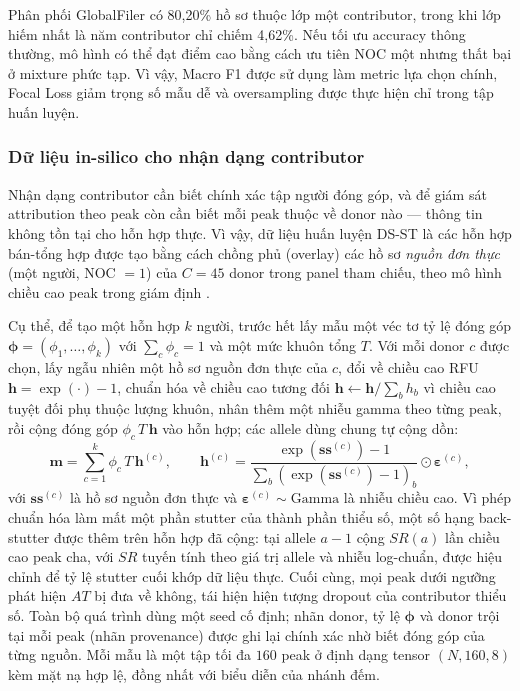 \documentclass[12pt,a4paper]{article}
\begin{document}
Phân phối GlobalFiler có 80,20\% hồ sơ thuộc lớp một contributor, trong khi lớp hiếm nhất là năm contributor chỉ chiếm 4,62\%. Nếu tối ưu accuracy thông thường, mô hình có thể đạt điểm cao bằng cách ưu tiên NOC một nhưng thất bại ở mixture phức tạp. Vì vậy, Macro F1 được sử dụng làm metric lựa chọn chính, Focal Loss giảm trọng số mẫu dễ và oversampling được thực hiện chỉ trong tập huấn luyện.

\subsubsection{Dữ liệu in-silico cho nhận dạng contributor}

Nhận dạng contributor cần biết chính xác tập người đóng góp, và để giám sát attribution theo peak còn cần biết mỗi peak thuộc về donor nào — thông tin không tồn tại cho hỗn hợp thực. Vì vậy, dữ liệu huấn luyện DS-ST là các hỗn hợp bán-tổng hợp được tạo bằng cách chồng phủ (overlay) các hồ sơ \emph{nguồn đơn thực} (một người, NOC \(=1\)) của \(C=45\) donor trong panel tham chiếu, theo mô hình chiều cao peak trong giám định \cite{bleka2016}.

Cụ thể, để tạo một hỗn hợp \(k\) người, trước hết lấy mẫu một véc tơ tỷ lệ đóng góp \(\bm{\phi}=(\phi_1,\dots,\phi_k)\) với \(\sum_c\phi_c=1\) và một mức khuôn tổng \(T\). Với mỗi donor \(c\) được chọn, lấy ngẫu nhiên một hồ sơ nguồn đơn thực của \(c\), đổi về chiều cao RFU \(\bm{h}=\exp(\cdot)-1\), chuẩn hóa về chiều cao tương đối \(\bm{h}\leftarrow\bm{h}/\textstyle\sum_b h_b\) vì chiều cao tuyệt đối phụ thuộc lượng khuôn, nhân thêm một nhiễu gamma theo từng peak, rồi cộng đóng góp \(\phi_c\,T\,\bm{h}\) vào hỗn hợp; các allele dùng chung tự cộng dồn:
\begin{equation}
\bm{m}=\sum_{c=1}^{k}\phi_c\,T\,\bm{h}^{(c)},\qquad \bm{h}^{(c)}=\frac{\exp(\bm{ss}^{(c)})-1}{\sum_b(\exp(\bm{ss}^{(c)})-1)_b}\odot \bm{\varepsilon}^{(c)},
\end{equation}
với \(\bm{ss}^{(c)}\) là hồ sơ nguồn đơn thực và \(\bm{\varepsilon}^{(c)}\sim\mathrm{Gamma}\) là nhiễu chiều cao. Vì phép chuẩn hóa làm mất một phần stutter của thành phần thiểu số, một số hạng back-stutter được thêm trên hỗn hợp đã cộng: tại allele \(a-1\) cộng \(SR(a)\) lần chiều cao peak cha, với \(SR\) tuyến tính theo giá trị allele và nhiễu log-chuẩn, được hiệu chỉnh để tỷ lệ stutter cuối khớp dữ liệu thực. Cuối cùng, mọi peak dưới ngưỡng phát hiện \(AT\) bị đưa về không, tái hiện hiện tượng dropout của contributor thiểu số. Toàn bộ quá trình dùng một seed cố định; nhãn donor, tỷ lệ \(\bm{\phi}\) và donor trội tại mỗi peak (nhãn provenance) được ghi lại chính xác nhờ biết đóng góp của từng nguồn. Mỗi mẫu là một tập tối đa \(160\) peak ở định dạng tensor \((N,160,8)\) kèm mặt nạ hợp lệ, đồng nhất với biểu diễn của nhánh đếm.
\end{document}
